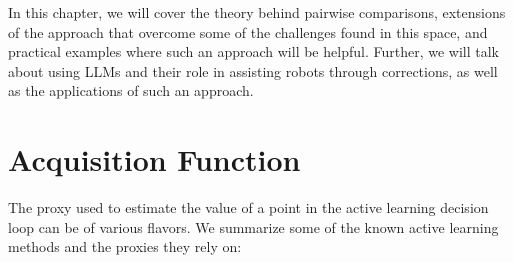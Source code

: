 \documentclass[
  letterpaper,
  DIV=11,
  numbers=noendperiod,
  oneside]{scrreprt}
\theoremstyle{remark}
\begin{document}
In this chapter, we will cover the theory behind pairwise comparisons,
extensions of the approach that overcome some of the challenges found in
this space, and practical examples where such an approach will be
helpful. Further, we will talk about using LLMs and their role in
assisting robots through corrections, as well as the applications of
such an approach.

\section{Acquisition Function}\label{acquisition-function}

The proxy used to estimate the value of a point in the active learning
decision loop can be of various flavors. We summarize some of the known
active learning methods and the proxies they rely on:
\end{document}
